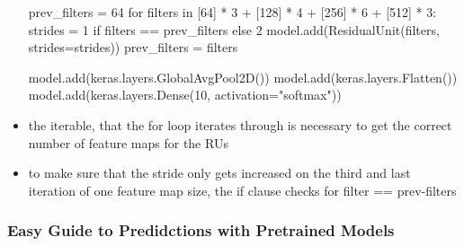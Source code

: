 \documentclass[12pt,a4paper]{article}
\begin{document}
\begin{itemize}
\begin{python}
    prev_filters = 64
    for filters in [64] * 3 + [128] * 4 + [256] * 6 + [512] * 3:
        strides = 1 if filters == prev_filters else 2
        model.add(ResidualUnit(filters, strides=strides))
        prev_filters = filters

    model.add(keras.layers.GlobalAvgPool2D())
    model.add(keras.layers.Flatten())
    model.add(keras.layers.Dense(10, activation="softmax")) 
  \end{python}
  \item the iterable, that the for loop iterates through is necessary to get the correct number of feature maps for the RUs
  \item to make sure that the stride only gets increased on the third and last iteration of one feature map size, the if clause checks for filter == prev-filters
\end{itemize}
\subsubsection{Easy Guide to Predidctions with Pretrained Models} %
\label{ssub:easy_guide_to_predidctions_with_pretrained_models}
\end{document}

